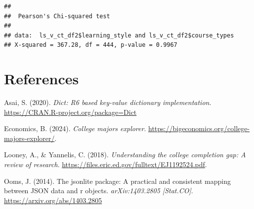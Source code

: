 \documentclass[
  twocolumn]{article}
\newenvironment{Shaded}{\begin{snugshade}}{\end{snugshade}}
\newcommand{\AttributeTok}[1]{\textcolor[rgb]{0.13,0.29,0.53}{#1}}
\newcommand{\CommentTok}[1]{\textcolor[rgb]{0.56,0.35,0.01}{\textit{#1}}}
\newcommand{\ConstantTok}[1]{\textcolor[rgb]{0.56,0.35,0.01}{#1}}
\newcommand{\DecValTok}[1]{\textcolor[rgb]{0.00,0.00,0.81}{#1}}
\newcommand{\FunctionTok}[1]{\textcolor[rgb]{0.13,0.29,0.53}{\textbf{#1}}}
\newcommand{\NormalTok}[1]{#1}
\newcommand{\OtherTok}[1]{\textcolor[rgb]{0.56,0.35,0.01}{#1}}
\newcommand{\SpecialCharTok}[1]{\textcolor[rgb]{0.81,0.36,0.00}{\textbf{#1}}}
\newcommand{\StringTok}[1]{\textcolor[rgb]{0.31,0.60,0.02}{#1}}
\newlength{\cslhangindent}
\newenvironment{CSLReferences}[2] %
 {\begin{list}{}{%
  \setlength{\itemindent}{0pt}
  \setlength{\leftmargin}{0pt}
  \setlength{\parsep}{0pt}
  \ifodd #1
   \setlength{\leftmargin}{\cslhangindent}
   \setlength{\itemindent}{-1\cslhangindent}
  \fi
  \setlength{\itemsep}{#2\baselineskip}}}
 {\end{list}}
\begin{document}
\begin{Shaded}
\end{Shaded}

\begin{verbatim}
## 
##  Pearson's Chi-squared test
## 
## data:  ls_v_ct_df2$learning_style and ls_v_ct_df2$course_types
## X-squared = 367.28, df = 444, p-value = 0.9967
\end{verbatim}

\section*{References}\label{references}

\label{refs}
\begin{CSLReferences}{1}{0}
Asai, S. (2020). \emph{Dict: R6 based key-value dictionary
implementation}. \url{https://CRAN.R-project.org/package=Dict}

Economics, B. (2024). \emph{College majors explorer}.
\url{https://bigeconomics.org/college-majors-explorer/}.

Looney, A., \& Yannelis, C. (2018). \emph{Understanding the college
completion gap: A review of research}.
\url{https://files.eric.ed.gov/fulltext/EJ1192524.pdf}.

Ooms, J. (2014). The jsonlite package: A practical and consistent
mapping between JSON data and r objects. \emph{arXiv:1403.2805
{[}Stat.CO{]}}. \url{https://arxiv.org/abs/1403.2805}

\end{CSLReferences}
\end{document}
